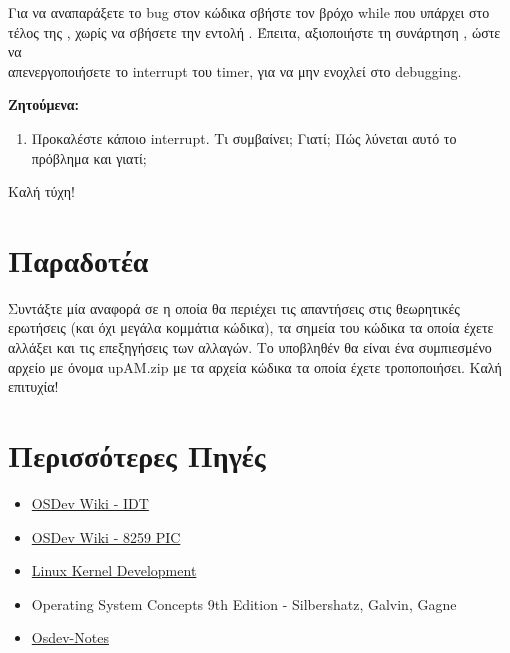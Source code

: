 \documentclass[18pt]{extarticle}
\begin{document}
\begin{question}
    Για να αναπαράξετε το bug στον κώδικα σβήστε τον βρόχο while που υπάρχει στο τέλος της , χωρίς να σβήσετε την εντολή .
    Έπειτα, αξιοποιήστε τη συνάρτηση , ώστε να \\ απενεργοποιήσετε το interrupt του timer, για να μην ενοχλεί στο debugging.

    \textbf{Ζητούμενα:}

    \begin{enumerate}
        \item Προκαλέστε κάποιο interrupt. Τι συμβαίνει; Γιατί; Πώς λύνεται αυτό το πρόβλημα και γιατί;
    \end{enumerate}

    Καλή τύχη!
\end{question}

\section{Παραδοτέα}

Συντάξτε μία αναφορά σε  η οποία θα περιέχει τις απαντήσεις στις θεωρητικές ερωτήσεις (και όχι μεγάλα κομμάτια κώδικα), τα σημεία του κώδικα τα οποία έχετε αλλάξει
και τις επεξηγήσεις των αλλαγών. Το υποβληθέν θα είναι ένα συμπιεσμένο αρχείο  με όνομα upAM.zip με τα αρχεία κώδικα τα οποία έχετε τροποποιήσει.
Καλή επιτυχία!

\section*{Περισσότερες Πηγές}

\begin{itemize}
    \item \href{https://wiki.osdev.org/Interrupt_Descriptor_Table}{OSDev Wiki - IDT}
    \item \href{https://wiki.osdev.org/8259_PIC}{OSDev Wiki - 8259 PIC}
    \item \href{https://www.doc-developpement-durable.org/file/Projets-informatiques/cours-&-manuels-informatiques/Linux/Linux\%20Kernel\%20Development,\%203rd\%20Edition.pdf}{Linux Kernel Development}
    \item Operating System Concepts 9th Edition - Silbershatz, Galvin, Gagne
    \item \href{https://github.com/dreamportdev/Osdev-Notes/blob/master/02_Architecture/05_InterruptHandling.md}{Osdev-Notes}
\end{itemize}
\end{document}
